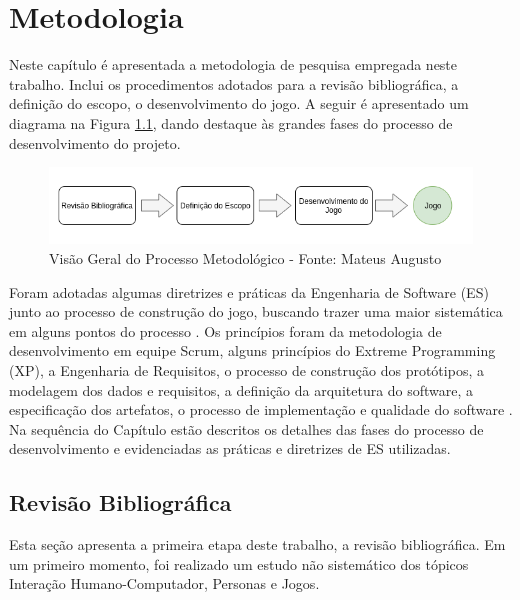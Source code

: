 \chapter{Metodologia}
\label{chap:Metodo}

Neste capítulo é apresentada a metodologia de pesquisa empregada neste trabalho. Inclui os procedimentos adotados para a revisão bibliográfica, a definição do escopo, o desenvolvimento do jogo. A seguir é apresentado um diagrama na Figura \ref{Fig:all_process.png}, dando destaque às grandes fases do processo de desenvolvimento do projeto.

\begin{figure}[htbp]
	\centering
		\includegraphics[keepaspectratio=true,scale=0.65]{figuras/all_process.png}
	\caption{Visão Geral do Processo Metodológico - Fonte: Mateus Augusto}
	\label{Fig:all_process.png}
\end{figure}

{\color{textmodified}
Foram adotadas algumas diretrizes e práticas da Engenharia de Software (ES) junto ao processo de construção do jogo, buscando trazer uma maior sistemática em alguns pontos do processo \cite[p. 39]{Pressman_2000} \cite[p. 31]{Bourque_2014}. Os princípios foram da metodologia de desenvolvimento em equipe Scrum, alguns princípios do Extreme Programming (XP), a Engenharia de Requisitos, o processo de construção dos protótipos, a modelagem dos dados e requisitos, a definição da arquitetura do software, a especificação dos artefatos, o processo de implementação e qualidade do software \cite[p. 74]{Pressman_2000}. Na sequência do Capítulo estão descritos os detalhes das fases do processo de desenvolvimento e evidenciadas as práticas e diretrizes de ES utilizadas. %
}

\section{Revisão Bibliográfica} 

Esta seção apresenta a primeira etapa deste trabalho, a revisão bibliográfica. Em um primeiro momento, foi realizado um estudo não sistemático dos tópicos Interação Humano-Computador, Personas e Jogos.

